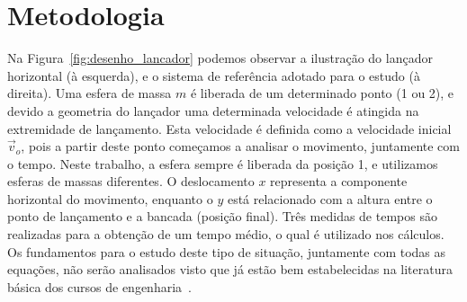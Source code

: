 \documentclass[article,11pt,a4paper]{abntex2}
\begin{document}










\section{Metodologia}


Na Figura~\ref{fig:desenho_lancador} podemos observar a ilustração do lançador horizontal (à esquerda), e o sistema de referência adotado para o estudo (à direita).
Uma esfera de massa $m$ é liberada de um determinado ponto (1 ou 2), e devido a geometria do lançador uma determinada velocidade é atingida na extremidade de lançamento.
Esta velocidade é definida como a velocidade inicial $\vec{v}_o$, pois a partir deste ponto começamos a analisar o movimento, juntamente com o tempo.
Neste trabalho, a esfera sempre é liberada da posição 1, e utilizamos esferas de massas diferentes.
O deslocamento $x$ representa a componente horizontal do movimento, enquanto o $y$ está relacionado com a altura entre o ponto de lançamento e a bancada (posição final).
Três medidas de tempos são realizadas para a obtenção de um tempo médio, o qual é utilizado nos cálculos.
Os fundamentos para o estudo deste tipo de situação, juntamente com todas as equações, não serão analisados visto que já estão bem estabelecidas na literatura básica dos cursos de engenharia~\cite{Resnick2012v1, Moyses2013v1}.
\end{document}
